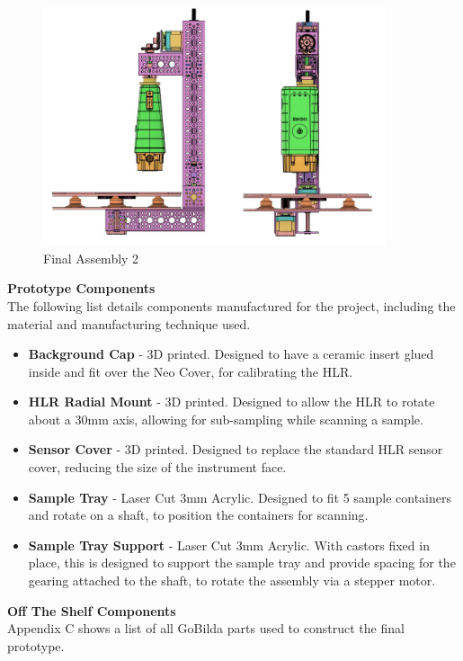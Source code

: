 \documentclass{UoNMCHA}
\numberwithin{equation}{section}
\begin{document}
\begin{figure}[H]
	\centering
	\includegraphics[width=0.9\textwidth]{FINAL_ASSEM_PERSPECTIVE.jpg}
	\caption{Final Assembly 2}
	\label{fig:Final Assembly 2}
\end{figure}
\textbf{Prototype Components}\\
The following list details components manufactured for the project, including the material and manufacturing technique used.\\
\begin{itemize}
	\item \textbf{Background Cap} - 3D printed. Designed to have a ceramic insert glued inside and fit over the Neo Cover, for calibrating the HLR.
	\item \textbf{HLR Radial Mount} - 3D printed. Designed to allow the HLR to rotate about a 30mm axis, allowing for sub-sampling while scanning a sample.
	\item \textbf{Sensor Cover} - 3D printed. Designed to replace the standard HLR sensor cover, reducing the size of the instrument face.
	\item \textbf{Sample Tray} - Laser Cut 3mm Acrylic. Designed to fit 5 sample containers and rotate on a shaft, to position the containers for scanning.
	\item \textbf{Sample Tray Support} - Laser Cut 3mm Acrylic. With castors fixed in place, this is designed to support the sample tray and provide spacing for the gearing attached to the shaft, to rotate the assembly via a stepper motor.
\end{itemize}
%
\textbf{Off The Shelf Components}\\
Appendix C shows a list of all GoBilda parts used to construct the final prototype.\\
\end{document}
